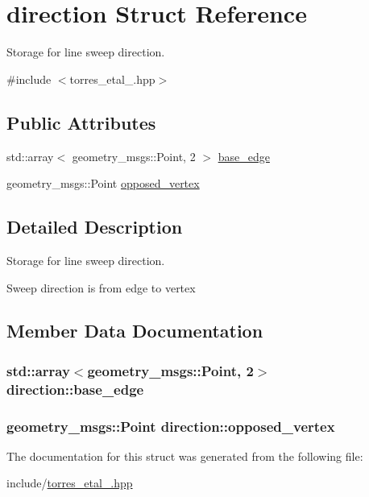 \hypertarget{structdirection}{}\section{direction Struct Reference}
\label{structdirection}


Storage for line sweep direction.  




{\ttfamily \#include $<$torres\+\_\+etal\+\_.\+hpp$>$}

\subsection*{Public Attributes}
\begin{DoxyCompactItemize}
\item 
std\+::array$<$ geometry\+\_\+msgs\+::\+Point, 2 $>$ \hyperlink{structdirection_acbd7433e76dc2b6b74fa869b93d729ef}{base\+\_\+edge}
\item 
geometry\+\_\+msgs\+::\+Point \hyperlink{structdirection_af85ec0869046129ce9c0fa15bbe103b4}{opposed\+\_\+vertex}
\end{DoxyCompactItemize}


\subsection{Detailed Description}
Storage for line sweep direction. 

Sweep direction is from edge to vertex 

\subsection{Member Data Documentation}
\subsubsection[{\texorpdfstring{base\+\_\+edge}{base_edge}}]{\setlength{\rightskip}{0pt plus 5cm}std\+::array$<$geometry\+\_\+msgs\+::\+Point, 2$>$ direction\+::base\+\_\+edge}\hypertarget{structdirection_acbd7433e76dc2b6b74fa869b93d729ef}{}\label{structdirection_acbd7433e76dc2b6b74fa869b93d729ef}
\subsubsection[{\texorpdfstring{opposed\+\_\+vertex}{opposed_vertex}}]{\setlength{\rightskip}{0pt plus 5cm}geometry\+\_\+msgs\+::\+Point direction\+::opposed\+\_\+vertex}\hypertarget{structdirection_af85ec0869046129ce9c0fa15bbe103b4}{}\label{structdirection_af85ec0869046129ce9c0fa15bbe103b4}


The documentation for this struct was generated from the following file\+:\begin{DoxyCompactItemize}
\item 
include/\hyperlink{torres__etal__2016_8hpp}{torres\+\_\+etal\+\_.\+hpp}\end{DoxyCompactItemize}
